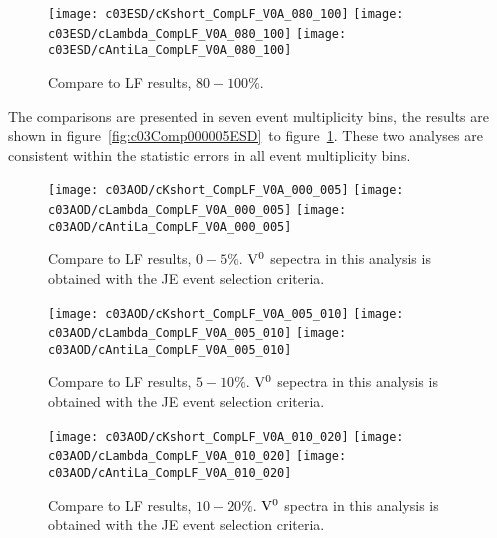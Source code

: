 \begin{figure}[htb]
\begin{center}
\texttt{[image: c03ESD/cKshort\_CompLF\_V0A\_080\_100]}
\texttt{[image: c03ESD/cLambda\_CompLF\_V0A\_080\_100]}
\texttt{[image: c03ESD/cAntiLa\_CompLF\_V0A\_080\_100]}
\caption{Compare to LF results, $80-100\%$.}
\label{fig:c03Comp080100ESD}
\end{center}
\end{figure}

The comparisons are presented in seven event multiplicity bins,
the results are shown
in figure~\ref{fig:c03Comp000005ESD}~to figure~\ref{fig:c03Comp080100ESD}.
These two analyses are consistent within the statistic errors in all
event multiplicity bins.

\begin{figure}[htb]
\begin{center}
\texttt{[image: c03AOD/cKshort\_CompLF\_V0A\_000\_005]}
\texttt{[image: c03AOD/cLambda\_CompLF\_V0A\_000\_005]}
\texttt{[image: c03AOD/cAntiLa\_CompLF\_V0A\_000\_005]}
\caption{Compare to LF results, $0-5\%$.
         ${\rm V}^{0}$ sepectra in this analysis is obtained with the
         JE event selection criteria.}
\label{fig:c03Comp000005AOD}
\end{center}
\end{figure}

\begin{figure}[htb]
\begin{center}
\texttt{[image: c03AOD/cKshort\_CompLF\_V0A\_005\_010]}
\texttt{[image: c03AOD/cLambda\_CompLF\_V0A\_005\_010]}
\texttt{[image: c03AOD/cAntiLa\_CompLF\_V0A\_005\_010]}
\caption{Compare to LF results, $5-10\%$.
         ${\rm V}^{0}$ sepectra in this analysis is obtained with the
         JE event selection criteria.}
\label{fig:c03Comp005010AOD}
\end{center}
\end{figure}

\begin{figure}[htb]
\begin{center}
\texttt{[image: c03AOD/cKshort\_CompLF\_V0A\_010\_020]}
\texttt{[image: c03AOD/cLambda\_CompLF\_V0A\_010\_020]}
\texttt{[image: c03AOD/cAntiLa\_CompLF\_V0A\_010\_020]}
\caption{Compare to LF results, $10-20\%$.
         ${\rm V}^{0}$ spectra in this analysis is obtained with the
         JE event selection criteria.}
\label{fig:c03Comp010020AOD}
\end{center}
\end{figure}

